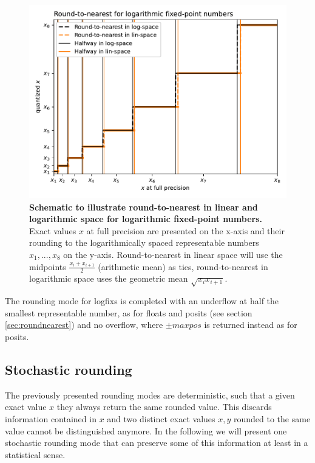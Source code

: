 \begin{figure}[tbhp]
	\includegraphics[width=1\textwidth]{Figures/methods/round_logquant.pdf}
	\caption{\textbf{Schematic to illustrate round-to-nearest in linear and logarithmic space for logarithmic
	fixed-point numbers.} Exact values $x$ at full precision are presented on the x-axis and their rounding
	to the logarithmically spaced representable numbers $x_1,...,x_8$ on the y-axis. Round-to-nearest in
	linear space will use the midpoints $\tfrac{x_i + x_{i+1}}{2}$ (arithmetic mean) as ties, round-to-nearest
	in logarithmic space uses the geometric mean $\sqrt{x_ix_{i+1}}$.}
	\label{fig:roundnearest_linlog}
\end{figure}

The rounding mode for logfixs is completed with an underflow at half the smallest representable number,
as for floats and posits (see section \ref{sec:roundnearest}) and no overflow, where $\pm maxpos$ is
returned instead as for posits. 

\subsection{Stochastic rounding}
\label{sec:stochastic_rounding}

The previously presented rounding modes are deterministic, such that a given exact value $x$ they always
return the same rounded value. This discards information contained in $x$ and two distinct exact values $x,y$
rounded to the same value cannot be distinguished anymore. In the following we will present one stochastic
rounding mode that can preserve some of this information at least in a statistical sense. 

